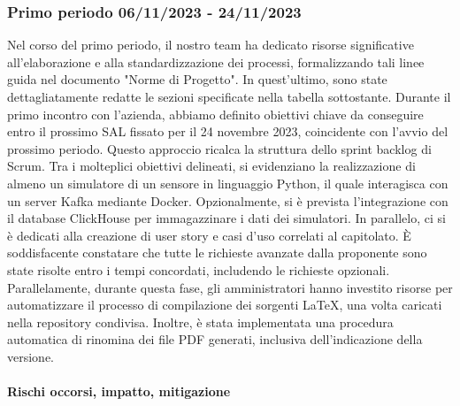 \documentclass{article}
\begin{document}
\subsubsection{Primo periodo  06/11/2023 - 24/11/2023}
Nel corso del primo periodo, il nostro team ha dedicato risorse significative all'elaborazione e alla standardizzazione dei processi, formalizzando tali linee guida nel documento "Norme di Progetto". In quest'ultimo, sono state dettagliatamente redatte le sezioni specificate nella tabella sottostante.
Durante il primo incontro con l'azienda, abbiamo definito obiettivi chiave da conseguire entro il prossimo SAL fissato per il 24 novembre 2023, coincidente con l'avvio del prossimo periodo. Questo approccio ricalca la struttura dello sprint backlog di Scrum.
Tra i molteplici obiettivi delineati, si evidenziano la realizzazione di almeno un simulatore di un sensore in linguaggio Python, il quale interagisca con un server Kafka mediante Docker. Opzionalmente, si è prevista l'integrazione con il database ClickHouse per immagazzinare i dati dei simulatori. In parallelo, ci si è dedicati alla creazione di user story e casi d'uso correlati al capitolato.
È soddisfacente constatare che tutte le richieste avanzate dalla proponente sono state risolte entro i tempi concordati, includendo le richieste opzionali.
Parallelamente, durante questa fase, gli amministratori hanno investito risorse per automatizzare il processo di compilazione dei sorgenti LaTeX, una volta caricati nella repository condivisa. Inoltre, è stata implementata una procedura automatica di rinomina dei file PDF generati, inclusiva dell'indicazione della versione.

\paragraph{Rischi occorsi, impatto, mitigazione}
\end{document}
